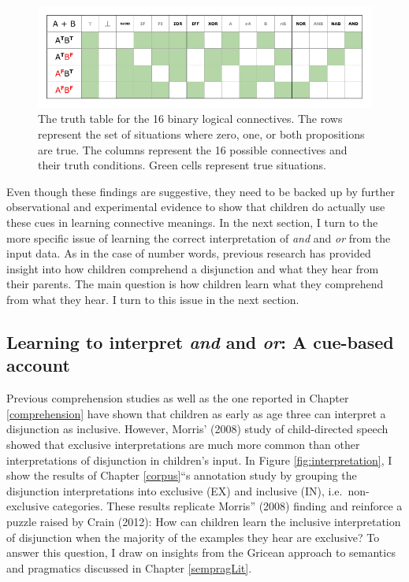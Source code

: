 \documentclass[floatsintext,man]{apa6}
\theoremstyle{definition}
\theoremstyle{definition}
\theoremstyle{definition}
\theoremstyle{remark}
\begin{document}
\begin{figure}[tb]

{\centering \includegraphics{figs/binaryLogicalConnectivess-1} 

}

\caption{The truth table for the 16 binary logical connectives. The rows represent the set of situations where zero, one, or both propositions are true. The columns represent the 16 possible connectives and their truth conditions. Green cells represent true situations.}\label{fig:binaryLogicalConnectivess}
\end{figure}

Even though these findings are suggestive, they need to be backed up by
further observational and experimental evidence to show that children do
actually use these cues in learning connective meanings. In the next
section, I turn to the more specific issue of learning the correct
interpretation of \emph{and} and \emph{or} from the input data. As in
the case of number words, previous research has provided insight into
how children comprehend a disjunction and what they hear from their
parents. The main question is how children learn what they comprehend
from what they hear. I turn to this issue in the next section.

\subsection{\texorpdfstring{Learning to interpret \emph{and} and
\emph{or}: A cue-based
account}{Learning to interpret and and or: A cue-based account}}\label{myaccount}

Previous comprehension studies as well as the one reported in Chapter
\ref{comprehension} have shown that children as early as age three can
interpret a disjunction as inclusive. However, Morris' (2008) study of
child-directed speech showed that exclusive interpretations are much
more common than other interpretations of disjunction in children's
input. In Figure \ref{fig:interpretation}, I show the results of Chapter
\ref{corpus}\enquote{s annotation study by grouping the disjunction
interpretations into exclusive (EX) and inclusive (IN),
i.e.~non-exclusive categories. These results replicate Morris} (2008)
finding and reinforce a puzzle raised by Crain (2012): How can children
learn the inclusive interpretation of disjunction when the majority of
the examples they hear are exclusive? To answer this question, I draw on
insights from the Gricean approach to semantics and pragmatics discussed
in Chapter \ref{sempragLit}.
\end{document}
